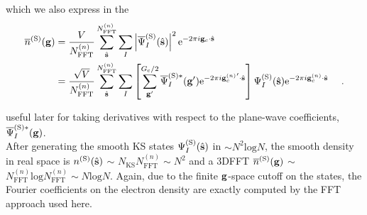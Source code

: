 \documentclass[paper=a4, fontsize=11pt]{article} %
\numberwithin{equation}{section} %
\numberwithin{figure}{section} %
\numberwithin{table}{section} %
\newcommand{\bs}{{\bf{s}}}
\newcommand{\bg}{{\bf{g}}}
\newcommand{\rS}{{\mathrm{S}}}
\newcommand{\re}{{\mathrm{e}}}
\newcommand{\rl}{{\mathrm{log}}}
\newcommand{\gc}{{\bg_c}}
\newcommand{\gcn}{{\bg_c^{(n)}}}
\newcommand{\igcs}{2\pi i\gc\cdot\hat \bs}
\newcommand{\igcns}{2\pi i\gcn\cdot\hat \bs}
\newcommand{\igpcns}{2\pi i\gcn'\cdot\hat \bs}
\newcommand{\psigsc}{{\overline \Psi_I^{(\rS)*}(\bg)}}
\newcommand{\NKS}{{N_{\mathrm{KS}}}}
\newcommand{\NFFTn}{{N^{(n)}_{\mathrm{FFT}}}}
\newcommand{\Gc}{{G_{\mathrm{c}}}}
\begin{document}
which we also express in the
\begin{equation} 
\begin{split}
\overline{n}^{(\rS)}(\bg) 
&= \frac{V}{\NFFTn}\sum_{\hat\bs}^{\NFFTn}  \sum_I \left| \overline \Psi_I^{(\rS)}(\hat \bs) \right|^2  \re^{-\igcs} \\
&= \frac{\sqrt V}{\NFFTn} \sum_{\hat\bs}^{\NFFTn}  \sum_I  \left[\sum_{\bg'}^{\Gc/2} \overline{\Psi}_I^{(\rS)*}(\bg')  \re^{-\igpcns}\right] \Psi_I^{(\rS)}(\hat \bs) \re^{-\igcns}\ \ \ \ . \\
\end{split}
\end{equation}

useful later for taking derivatives with respect to the plane-wave coefficients,  $\psigsc$.\\

After generating the smooth KS states $\Psi_I^{(\rS)}(\hat \bs)$ in $\sim N^2 \rl N$, the smooth density in real space is $n^{(\rS)}(\hat \bs)$ $\sim$ $\NKS \NFFTn \sim N^2$ and a 3DFFT $\overline{n}^{(\rS)}(\bg)$ $\sim$ $\NFFTn \rl \NFFTn \sim N \rl N$. Again, due to the finite $\bg$-space cutoff on the states, the Fourier coefficients on the electron density are exactly computed by the FFT approach used here.
\end{document}
